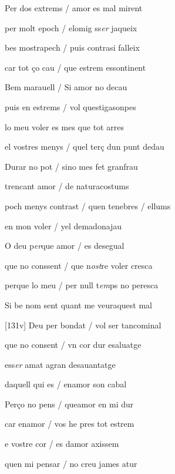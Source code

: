 \documentclass[12pt]{article}
\begin{document}
\begin{estrofa}

 Per dos extrems / amor es mal mirent

 per molt epoch / elomig ss\textit{er }jaqueix

 bes mostrapech / puis contrasi falleix

 car tot \c{c}o cau / que estrem essontinent

 Bem marauell / Si amor no decau

 puis en estrems / vol questigasonpes

 lo meu voler es mes que tot arres

 el vostres menys / quel ter\c{c} dun punt dedau

\end{estrofa}



\begin{estrofa}

 Durar no pot / sino mes fet granfrau

 trencant amor / de naturacostums

 poch menys contrast / quen tenebres / ellums

 en mon voler / yel demadonajau

 O deu p\textit{er}que amor / es desegual

 que no conssent / que n\textit{ost}re voler cresca

 perque lo meu / per null t\textit{em}ps no peresca

 Si be nom sent quant me veuraquest mal

\end{estrofa}



\begin{estrofa}

 [131v] Deu per bondat / vol ser tancominal

 que no consent / vn cor dur esaluatge

 ess\textit{er} amat agran desauantatge

 daquell qui es / enamor son cabal

 Per\c{c}o no pens / queamor en mi dur

 car enamor / vos he pres tot estrem

 e vostre cor / es damor axissem

 quen mi pensar / no creu james atur

\end{estrofa}
\end{document}
